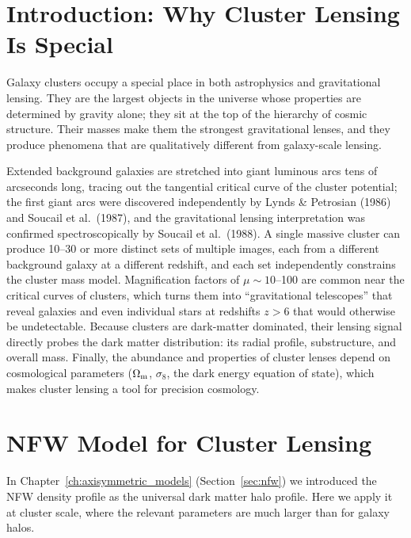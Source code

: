 \section{Introduction: Why Cluster Lensing Is Special}
\label{sec:cluster_intro}

Galaxy clusters occupy a special place in both astrophysics and
gravitational lensing.  They are the largest objects in the universe
whose properties are determined by gravity alone; they sit at the
top of the hierarchy of cosmic structure.  Their masses make them
the strongest gravitational lenses, and they produce phenomena that
are qualitatively different from galaxy-scale lensing.

Extended background galaxies are stretched into giant luminous arcs
tens of arcseconds long, tracing out the tangential critical curve
of the cluster potential; the first giant arcs were discovered
independently by Lynds \& Petrosian (1986) and Soucail et al.\
(1987), and the gravitational lensing interpretation was confirmed
spectroscopically by Soucail et al.\ (1988).  A single massive
cluster can produce 10--30 or more distinct sets of multiple images,
each from a different background galaxy at a different redshift, and
each set independently constrains the cluster mass model.
Magnification factors of $\mu \sim 10$--100 are common near the
critical curves of clusters, which turns them into ``gravitational
telescopes'' that reveal galaxies and even individual stars at
redshifts $z > 6$ that would otherwise be undetectable.  Because
clusters are dark-matter dominated, their lensing signal directly
probes the dark matter distribution: its radial profile,
substructure, and overall mass.  Finally, the abundance and
properties of cluster lenses depend on cosmological parameters
($\Omega_{\mathrm{m}}$, $\sigma_8$, the dark energy equation of state), which
makes cluster lensing a tool for precision cosmology.


\section{NFW Model for Cluster Lensing}
\label{sec:nfw_cluster}

In Chapter~\ref{ch:axisymmetric_models} (Section~\ref{sec:nfw}) we
introduced the NFW density profile as the universal dark matter halo
profile.  Here we apply it at cluster scale, where the
relevant parameters are much larger than for galaxy halos.

